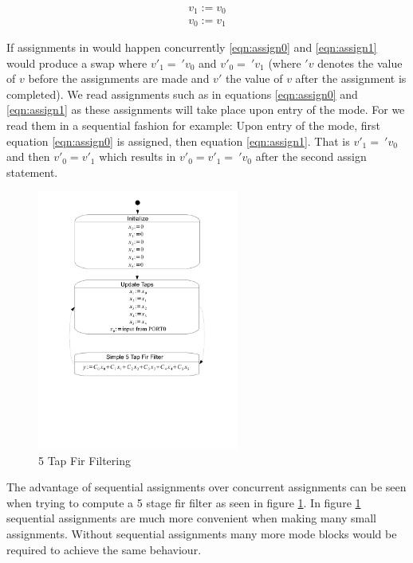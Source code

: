 \begin{align}
v_1 := v_0 \label{eqn:assign0} \\ 
v_0 := v_1 \label{eqn:assign1}
\end{align}

If assignments in  would happen concurrently \ref{eqn:assign0} and \ref{eqn:assign1} would produce a swap where $v'_1 =\: 'v_0$ and $v'_0 =\: 'v_1$ (where $'v$ denotes the value of $v$ before the assignments are made and $v'$ the value of $v$ after the assignment is completed). We read assignments such as in equations \ref{eqn:assign0} and \ref{eqn:assign1} as these assignments will take place upon entry of the mode. For  we read them in a sequential fashion for example: Upon entry of the mode, first equation \ref{eqn:assign0} is assigned, then equation \ref{eqn:assign1}. That is $v'_1 =\: 'v_0$ and then $v'_0 = v'_1$ which results in $v'_0 = v'_1 =\: 'v_0$ after the second assign statement.

\begin{figure}[htp]
    \centering
    \includegraphics[trim= 10mm 70mm 10mm 10mm, clip, width=250px]{./images/state_uml2_fir.pdf}
    \caption{5 Tap Fir Filtering}
    \label{fig:state_uml2_fir}
\end{figure}

The advantage of sequential assignments over concurrent assignments can be seen when trying to compute a 5 stage fir filter as seen in figure \ref{fig:state_uml2_fir}. In figure \ref{fig:state_uml2_fir} sequential assignments are much more convenient when making many small assignments. Without sequential assignments many more mode blocks would be required to achieve the same behaviour.




